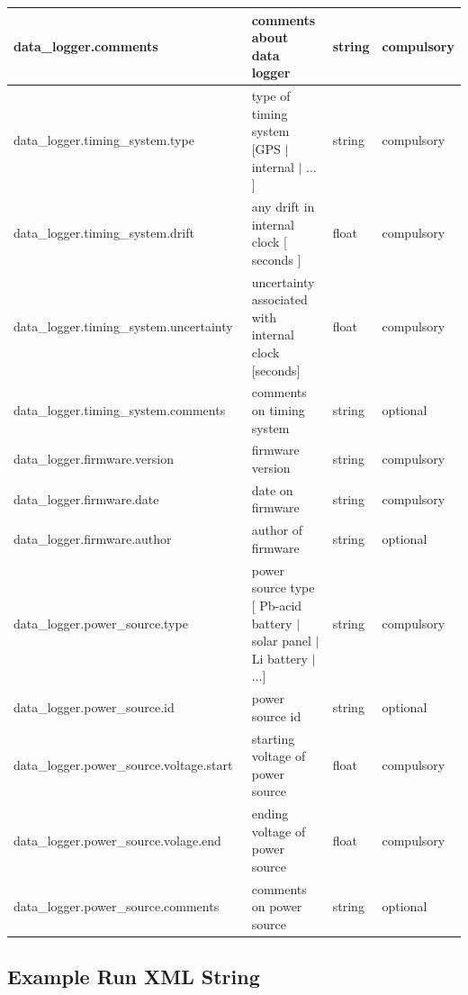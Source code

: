 \documentclass{article}
\begin{document}
\begin{table}[htb!]
\begin{tabular}{|l|p{3.2in}|l|l|}
        data\_logger.comments\ & comments about data logger & string & compulsory \\ \hline
        data\_logger.timing\_system.type\ & type of timing system [GPS $|$ internal $|$ ... ] & string & compulsory \\ \hline
        data\_logger.timing\_system.drift\ & any drift in internal clock [ seconds ] & float & compulsory \\ \hline
        data\_logger.timing\_system.uncertainty\ & uncertainty associated with internal clock [seconds] & float & compulsory \\ \hline
        data\_logger.timing\_system.comments\ & comments on timing system & string & optional \\ \hline
        data\_logger.firmware.version\ & firmware version & string & compulsory \\ \hline
        data\_logger.firmware.date\ & date on firmware & string & compulsory \\ \hline
        data\_logger.firmware.author\ & author of firmware & string & optional \\ \hline
        data\_logger.power\_source.type\ & power source type [ Pb-acid battery $|$ solar panel $|$ Li battery $|$ ...] & string & compulsory \\ \hline
        data\_logger.power\_source.id\ & power source id & string & optional \\ \hline
        data\_logger.power\_source.voltage.start\ & starting voltage of power source & float & compulsory \\ \hline
        data\_logger.power\_source.volage.end\ & ending voltage of power source & float & compulsory \\ \hline
        data\_logger.power\_source.comments\ & comments on power source & string & optional \\ \hline
    \end{tabular}
    \label{tab:run}
\end{table}

\subsection{Example Run XML String}
\end{document}
